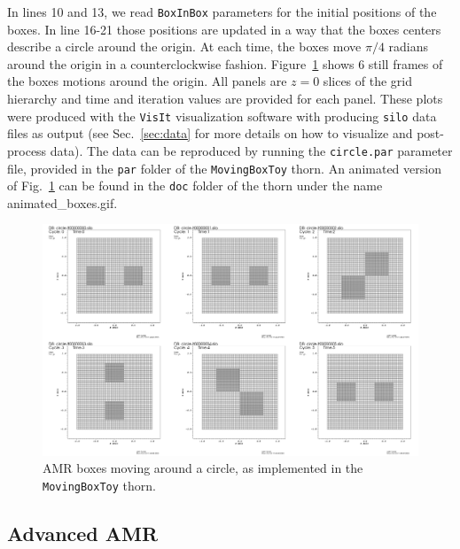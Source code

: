 In lines 10 and 13, we read \texttt{BoxInBox} parameters for the initial positions of the boxes. In line 16-21 those positions are updated in a way that the boxes centers describe a circle around the origin. At each time, the boxes move $\pi/4$ radians around the origin in a counterclockwise fashion. Figure~\ref{fig:boxes_circle} shows 6 still frames of the boxes motions around the origin. All panels are $z=0$ slices of the grid hierarchy and time and iteration values are provided for each panel. These plots were produced with the \texttt{VisIt} visualization software with \CarpetX\space producing \texttt{silo} data files as output (see Sec.~\ref{sec:data} for more details on how to visualize and post-process \CarpetX\space data). The data can be reproduced by running the \texttt{circle.par} parameter file, provided in the \texttt{par} folder of the \texttt{MovingBoxToy} thorn. An animated version of Fig.~\ref{fig:boxes_circle} can be found in the \texttt{doc} folder of the \CarpetX\space thorn under the name {animated\_boxes.gif}.

\begin{figure}[ht]
  \begin{center}
      \includegraphics[width=\linewidth]{boxes_frames.png}
  \end{center}
  \caption{AMR boxes moving around a circle, as implemented in the \texttt{MovingBoxToy} thorn.}
  \label{fig:boxes_circle}
\end{figure}

\subsection{Advanced AMR}
\label{sec:advanced_amr}

